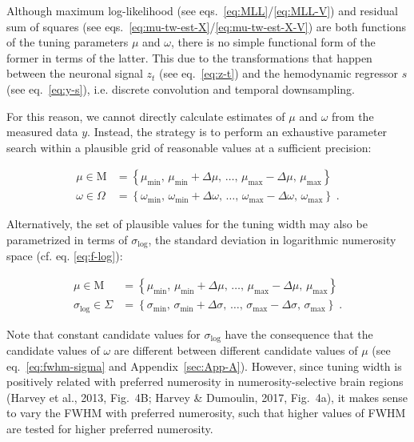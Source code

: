 \documentclass[a4paper,12pt]{article}
\begin{document}
Although maximum log-likelihood (see eqs.~\ref{eq:MLL}/\ref{eq:MLL-V}) and residual sum of squares (see eqs.~\ref{eq:mu-tw-est-X}/\ref{eq:mu-tw-est-X-V}) are both functions of the tuning parameters $\mu$ and $\omega$, there is no simple functional form of the former in terms of the latter. This due to the transformations that happen between the neuronal signal $z_t$ (see eq.~\ref{eq:z-t}) and the hemodynamic regressor $s$ (see eq.~\ref{eq:y-s}), i.e. discrete convolution and temporal downsampling.

For this reason, we cannot directly calculate estimates of $\mu$ and $\omega$ from the measured data $y$. Instead, the strategy is to perform an exhaustive parameter search within a plausible grid of reasonable values at a sufficient precision:

\vspace{-0.5em}
\begin{equation} \label{eq:fgs-fwhm}
\begin{split}
\mu \in \mathrm{M} &= \left\lbrace \mu_\mathrm{min}, \, \mu_\mathrm{min} + \Delta \mu, \, \ldots, \, \mu_\mathrm{max} - \Delta \mu, \, \mu_\mathrm{max} \right\rbrace \\
\omega \in \Omega &= \left\lbrace \omega_\mathrm{min}, \, \omega_\mathrm{min} + \Delta \omega, \, \ldots, \, \omega_\mathrm{max} - \Delta \omega, \, \omega_\mathrm{max} \right\rbrace \; .
\end{split}
\end{equation}

Alternatively, the set of plausible values for the tuning width may also be parametrized in terms of $\sigma_\mathrm{log}$, the standard deviation in logarithmic numerosity space (cf. eq. \ref{eq:f-log}):

\vspace{-0.5em}
\begin{equation} \label{eq:fgs-sig}
\begin{split}
\mu \in \mathrm{M} &= \left\lbrace \mu_\mathrm{min}, \, \mu_\mathrm{min} + \Delta \mu, \, \ldots, \, \mu_\mathrm{max} - \Delta \mu, \, \mu_\mathrm{max} \right\rbrace \\
\sigma_\mathrm{log} \in \Sigma &= \left\lbrace \sigma_\mathrm{min}, \, \sigma_\mathrm{min} + \Delta \sigma, \, \ldots, \, \sigma_\mathrm{max} - \Delta \sigma, \, \sigma_\mathrm{max} \right\rbrace \; .
\end{split}
\end{equation}

Note that constant candidate values for $\sigma_\mathrm{log}$ have the consequence that the candidate values of $\omega$ are different between different candidate values of $\mu$ (see eq.~\ref{eq:fwhm-sigma} and Appendix~\ref{sec:App-A}). However, since tuning width is positively related with preferred numerosity in numerosity-selective brain regions (Harvey et al., 2013, Fig.~4B; Harvey \& Dumoulin, 2017, Fig.~4a), it makes sense to vary the FWHM with preferred numerosity, such that higher values of FWHM are tested for higher preferred numerosity.
\end{document}
